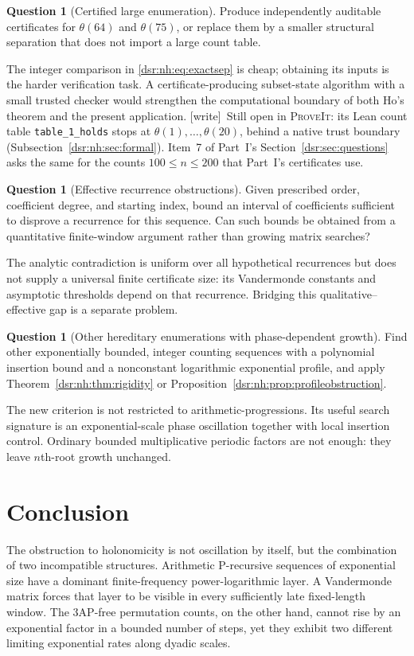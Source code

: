 \documentclass[11pt,a4paper]{article}
\numberwithin{equation}{section}
\theoremstyle{definition}
\newtheorem{question}[theorem]{Question}
\theoremstyle{remark}
\newcommand{\repo}{\textsc{ProveIt}}
\newcommand{\wtag}{\textup{[write]}}
\newcommand{\lean}[1]{\nolinkurl{#1}}
\newcommand{\tht}{\theta}
\theoremstyle{definition}
\theoremstyle{plain}
\begin{document}
\begin{question}[Certified large enumeration]
\label{dsr:nh:q:certified}%
Produce independently auditable certificates for $\tht(64)$ and $\tht(75)$,
or replace them by a smaller structural separation that does not import a
large count table.
\end{question}
The integer comparison in \eqref{dsr:nh:eq:exactsep} is cheap; obtaining its inputs
is the harder verification task. A certificate-producing subset-state
algorithm with a small trusted checker would strengthen the computational
boundary of both Ho's theorem and the present application.
\wtag\ Still open in \repo: its Lean count table
\lean{table_1_holds} stops at $\tht(1),\ldots,\tht(20)$, behind a native trust
boundary (Subsection~\ref{dsr:nh:sec:formal}). Item~7 of Part~I's
Section~\ref{dsr:sec:questions} asks the same for the counts
$100\le n\le200$ that Part~I's certificates use.

\begin{question}[Effective recurrence obstructions]
Given prescribed order, coefficient degree, and starting index, bound an
interval of coefficients sufficient to disprove a recurrence for this
sequence. Can such bounds be obtained from a quantitative finite-window
argument rather than growing matrix searches?
\end{question}
The analytic contradiction is uniform over all hypothetical recurrences but
does not supply a universal finite certificate size: its Vandermonde
constants and asymptotic thresholds depend on that recurrence. Bridging
this qualitative--effective gap is a separate problem.

\begin{question}[Other hereditary enumerations with phase-dependent growth]
Find other exponentially bounded, integer counting sequences with a
polynomial insertion bound and a nonconstant logarithmic exponential
profile, and apply Theorem~\ref{dsr:nh:thm:rigidity} or
Proposition~\ref{dsr:nh:prop:profileobstruction}.
\end{question}
The new criterion is not restricted to arithmetic-progressions. Its useful
search signature is an exponential-scale phase oscillation together with
local insertion control. Ordinary bounded multiplicative periodic factors
are not enough: they leave $n$th-root growth unchanged.

\section{Conclusion}
\label{dsr:nh:sec:conclusion}
The obstruction to holonomicity is not oscillation by itself, but the
combination of two incompatible structures. Arithmetic P-recursive
sequences of exponential size have a dominant finite-frequency
power-logarithmic layer. A Vandermonde matrix forces that layer to be
visible in every sufficiently late fixed-length window. The 3AP-free
permutation counts, on the other hand, cannot rise by an exponential factor
in a bounded number of steps, yet they exhibit two different limiting
exponential rates along dyadic scales.
\end{document}
